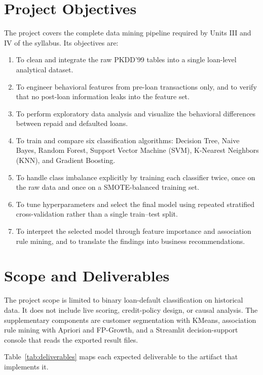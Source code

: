 \section{Project Objectives}
The project covers the complete data mining pipeline required by Units III and IV of the syllabus. Its objectives are:

\begin{enumerate}
    \item To clean and integrate the raw PKDD'99 tables into a single loan-level analytical dataset.
    \item To engineer behavioral features from pre-loan transactions only, and to verify that no post-loan information leaks into the feature set.
    \item To perform exploratory data analysis and visualize the behavioral differences between repaid and defaulted loans.
    \item To train and compare six classification algorithms: Decision Tree, Naive Bayes, Random Forest, Support Vector Machine (SVM), K-Nearest Neighbors (KNN), and Gradient Boosting.
    \item To handle class imbalance explicitly by training each classifier twice, once on the raw data and once on a SMOTE-balanced training set.
    \item To tune hyperparameters and select the final model using repeated stratified cross-validation rather than a single train--test split.
    \item To interpret the selected model through feature importance and association rule mining, and to translate the findings into business recommendations.
\end{enumerate}

\section{Scope and Deliverables}
The project scope is limited to binary loan-default classification on historical data. It does not include live scoring, credit-policy design, or causal analysis. The supplementary components are customer segmentation with KMeans, association rule mining with Apriori and FP-Growth, and a Streamlit decision-support console that reads the exported result files.

Table~\ref{tab:deliverables} maps each expected deliverable to the artifact that implements it.

